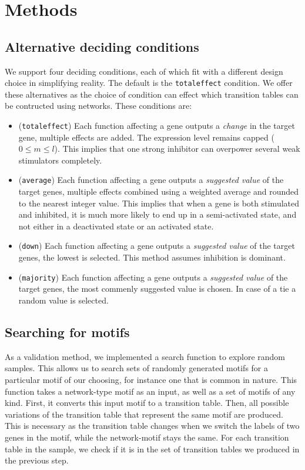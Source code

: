 \documentclass[../main.tex]{subfiles}
\begin{document}
\section{Methods}
\label{appendix_methods}

\subsection{Alternative deciding conditions}
\label{alternative_deciding}

We support four deciding conditions, each of which fit with a different design choice in simplifying reality.
The default is the \texttt{totaleffect} condition.
We offer these alternatives as the choice of condition can effect which transition tables can be contructed using networks.
These conditions are:
%
\begin{itemize}
\itemsep0em 
\item (\texttt{totaleffect}) Each function affecting a gene outputs a \textit{change} in the target gene, multiple effects are added. The expression level remains capped ($0 \le m \le l$). This implies that one strong inhibitor can overpower several weak stimulators completely.
\item (\texttt{average}) Each function affecting a gene outputs a \textit{suggested value} of the target genes, multiple effects combined using a weighted average and rounded to the nearest integer value. This implies that when a gene is both stimulated and inhibited, it is much more likely to end up in a semi-activated state, and not either in a deactivated state or an activated state.
\item (\texttt{down}) Each function affecting a gene outputs a \textit{suggested value} of the target genes, the lowest is selected. This method assumes inhibition is dominant.
\item (\texttt{majority}) Each function affecting a gene outputs a \textit{suggested value} of the target genes, the most commenly suggested value is chosen. In case of a tie a random value is selected.
\end{itemize}

\subsection{Searching for motifs}

As a validation method, we implemented a search function to explore random samples.
This allows us to search sets of randomly generated motifs for a particular motif of our choosing, for instance one that is common in nature.
This function takes a network-type motif as an input, as well as a set of motifs of any kind.
First, it converts this input motif to a transition table.
Then, all possible variations of the transition table that represent the same motif are produced.
This is necessary as the transition table changes when we switch the labels of two genes in the motif, while the network-motif stays the same.
For each transition table in the sample, we check if it is in the set of transition tables we produced in the previous step.

\end{document}
